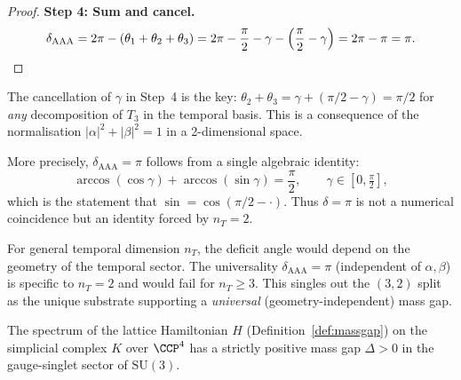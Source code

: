 \begin{proof}
\medskip\noindent
\textbf{Step 4: Sum and cancel.}
\begin{equation}
\delta_{\mathrm{AAA}} = 2\pi - (\theta_1 + \theta_2 + \theta_3)
= 2\pi - \frac{\pi}{2} - \gamma - \Bigl(\frac{\pi}{2} - \gamma\Bigr)
= 2\pi - \pi = \pi. \qedhere
\end{equation}
\end{proof}

\begin{remark}[Why $\delta = \pi$ is exact]
The cancellation of $\gamma$ in Step~4 is the key: $\theta_2 + \theta_3
= \gamma + (\pi/2 - \gamma) = \pi/2$ for \emph{any} decomposition of
$T_3$ in the temporal basis.  This is a consequence of the normalisation
$|\alpha|^2 + |\beta|^2 = 1$ in a 2-dimensional space.

More precisely, $\delta_{\mathrm{AAA}} = \pi$ follows from a single
algebraic identity:
\begin{equation}
\arccos(\cos\gamma) + \arccos(\sin\gamma) = \frac{\pi}{2},
\qquad \gamma \in [0, \tfrac{\pi}{2}],
\end{equation}
which is the statement that $\sin = \cos(\pi/2 - \cdot)$.  Thus
$\delta = \pi$ is not a numerical coincidence but an identity forced by
$n_T = 2$.
\end{remark}

\begin{remark}
For general temporal dimension $n_T$, the deficit angle would depend on
the geometry of the temporal sector. The universality
$\delta_{\mathrm{AAA}} = \pi$ (independent of $\alpha, \beta$) is
specific to $n_T = 2$ and would fail for $n_T \geq 3$.  This
singles out the $(3,2)$ split as the unique substrate supporting a
\emph{universal} (geometry-independent) mass gap.
\end{remark}

\begin{theorem}
\label{thm:massgap}
The spectrum of the lattice Hamiltonian $H$
(Definition~\ref{def:massgap}) on the simplicial complex $K$
over $\CCP^4$ has a strictly positive mass gap $\Delta > 0$
in the gauge-singlet sector of $\mathrm{SU}(3)$.
\end{theorem}

